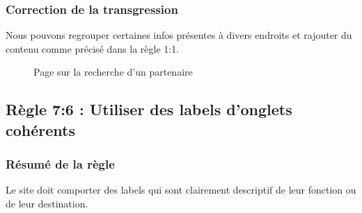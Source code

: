 \documentclass{article}[12pt]
\begin{document}
    \subsubsection*{Correction de la transgression}
    Nous pouvons regrouper certaines infos présentes à divers endroits et rajouter du contenu comme précisé dans la règle 1:1.
    \begin{figure}[H]
    	\centering
        \caption{Page sur la recherche d'un partenaire}
    \end{figure}
    
     \subsection{Règle 7:6 : Utiliser des labels d'onglets cohérents}
     \label{label_coherent}
    \subsubsection*{Résumé de la règle}
   Le site doit comporter des labels qui sont clairement descriptif de leur fonction ou de leur destination.
\end{document}
